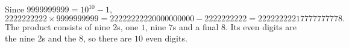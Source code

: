 Since $9999999999=10^{10}-1$,
\[2222222222\times9999999999=22222222220000000000-2222222222=22222222217777777778.\]
The product consists of nine $2$s, one $1$, nine $7$s and a final $8$. Its even digits are the nine $2$s and the $8$, so there are $\boxed{10}$ even digits.
